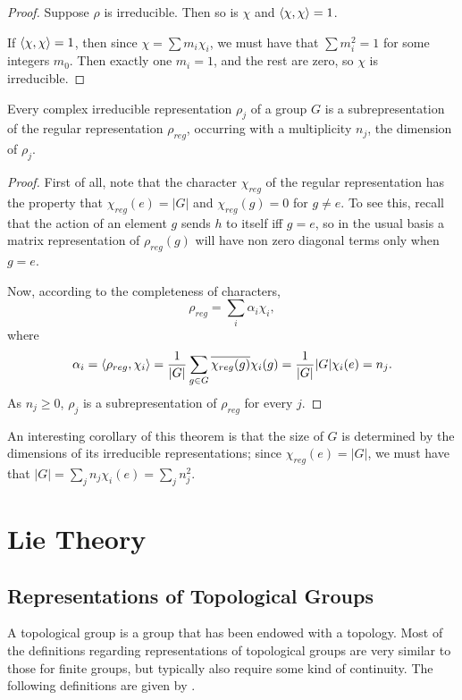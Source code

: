 \documentclass[a4paper]{article}
\begin{document}
\begin{proof}
    Suppose $\rho$ is irreducible. Then so is $\chi$ and $\left\langle \chi , \chi \right\rangle = 1$. 

    If $\left\langle \chi , \chi \right\rangle = 1$, then since $\chi = \sum m_i \chi_i$, we must have that $\sum m_i^2 = 1$ for some integers $m_0$. Then exactly one $m_i=1$, and the rest are zero, so $\chi$ is irreducible.
\end{proof}

\begin{thm}
    Every complex irreducible representation $\rho_j$ of a group $G$ is a subrepresentation of the regular representation $\rho_{reg}$, occurring with a multiplicity $n_j$, the dimension of $\rho_j$.
\end{thm}

\begin{proof}
    First of all, note that the character $\chi_{reg}$ of the regular representation has the property that $\chi_{reg}(e) = |G|$ and $\chi_{reg}(g) = 0$ for $g \neq e$. To see this, recall that the action of an element $g$ sends $h$ to itself iff $g = e$, so in the usual basis a matrix representation of $\rho_{reg}(g)$ will have non zero diagonal terms only when $g = e$. 
    
    Now, according to the completeness of characters,
    $$\rho_{reg} = \sum_i \alpha_i \chi_i,$$
    where $$\alpha_i = \left\langle \rho_{reg} , \chi_i \right\rangle = \frac{1}{|G|}\sum_{g\in G} \overline{\chi_{reg}(g)} \chi_i(g) = \frac{1}{|G|} |G| \chi_i(e) = n_j.$$
    As $n_j \geq 0$, $\rho_j$ is a subrepresentation of $\rho_{reg}$ for every $j$.
\end{proof}

An interesting corollary of this theorem is that the size of $G$ is determined by the dimensions of its irreducible representations; since $\chi_{reg}(e) = |G|$, we must have that $|G| = \sum_{j} n_j \chi_i(e) = \sum_{j} n_j^2$.

\newpage
\section{Lie Theory}
\subsection{Representations of Topological Groups}
A topological group is a group that has been endowed with a topology. Most of the definitions regarding representations of topological groups are very similar to those for finite groups, but typically also require some kind of continuity. 
The following definitions are given by \cite{alex}.
\end{document}
